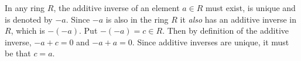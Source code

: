 \documentclass[12pt]{article}
\begin{document}
In any ring $R$, the additive inverse of an element $a \in R$ must exist, is unique and is  denoted  by $-a$.  Since $-a$ is also in the ring $R$  it {\em also} has an additive inverse in $R$, which is  $-(-a)$.  Put $-(-a) = c \in R$.
Then by definition of the additive inverse,
$-a + c = 0$ and $-a+a = 0$. Since additive inverses are unique, it must be that
$c = a$. 
\end{document}
